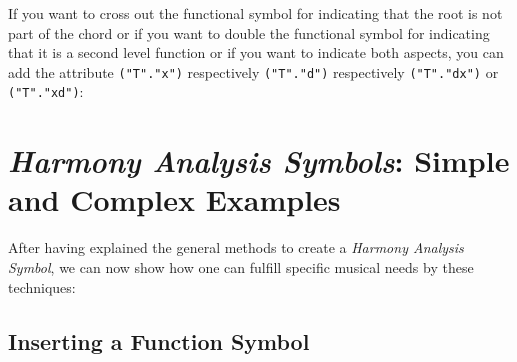 \documentclass[
  DIV=calc,
  BCOR=5mm,
  12pt,
  headings=small,
  oneside,
  abstract=true,
  toc=bib,
  xcolor=dvipsnames,
  openany,
  ngerman,english]{scrartcl}
\newcommand{\has}[1]{\textit{Harmony Analysis Symbol#1}}
\begin{document}
\begin{center}
\end{center}

If you want to cross out the functional symbol for indicating that the root is
not part of the chord or if you want to double the functional symbol for
indicating that it is a second level function or if you want to indicate both
aspects, you can add the attribute \verb|("T"."x")| respectively
\verb|("T"."d")| respectively \verb|("T"."dx")| or \verb|("T"."xd")|:

\begin{center}
\end{center}

\section{\has{s}: Simple and Complex Examples}

After having explained the general methods to create a \has{}, we can now show
how one can fulfill specific musical needs by these techniques:

\subsection{Inserting a Function Symbol}
\end{document}
